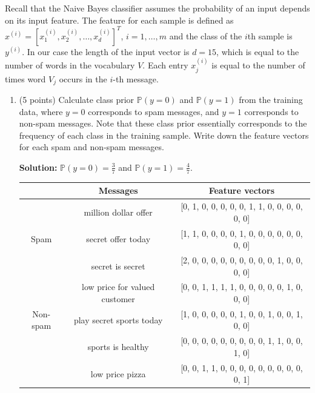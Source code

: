 \documentclass[twoside,10pt]{article}
\begin{document}
\begin{enumerate}
Recall that the Naive Bayes classifier assumes the probability of an input depends on its input feature. The feature for each sample is defined as
$x^{(i)} = [x_1^{(i)}, x_2^{(i)}, \ldots, x_d^{(i)}]^T$, $i = 1, \ldots, m$ and the class of the $i$th sample is $y^{(i)}$. In our case the length of the input vector is $d = 15$, which is equal to the number of words in the vocabulary $V$. Each entry $x_j^{(i)}$ is equal to the number of times word $V_j$ occurs in the $i$-th message. %

\begin{enumerate}
\item (5 points) Calculate class prior $\mathbb P(y = 0)$ and $\mathbb P(y = 1)$ from the training data, where $y = 0$ corresponds to spam messages, and $y = 1$ corresponds to non-spam messages. Note that these class prior essentially corresponds to the frequency of each class in the training sample. Write down the feature vectors for each spam and non-spam messages.
\begin{tcolorbox}
\textbf{Solution:} $\mathbb P(y = 0) = \frac 3 7$ and $\mathbb P(y = 1) = \frac 4 7$.
\begin{center}
	\begin{tabular}{| c | c | c |}%
	\hline
& Messages & Feature vectors \\
\hline
& million dollar offer & [0, 1, 0, 0, 0, 0, 0, 1, 1, 0, 0, 0, 0, 0, 0] \\
Spam & secret offer today & [1, 1, 0, 0, 0, 0, 1, 0, 0, 0, 0, 0, 0, 0, 0] \\
& secret is secret & [2, 0, 0, 0, 0, 0, 0, 0, 0, 0, 1, 0, 0, 0, 0] \\
\hline
& low price for valued customer & [0, 0, 1, 1, 1, 1, 0, 0, 0, 0, 0, 1, 0, 0, 0] \\
Non-spam & play secret sports today & [1, 0, 0, 0, 0, 0, 1, 0, 0, 1, 0, 0, 1, 0, 0] \\
& sports is healthy & [0, 0, 0, 0, 0, 0, 0, 0, 0, 1, 1, 0, 0, 1, 0] \\
& low price pizza & [0, 0, 1, 1, 0, 0, 0, 0, 0, 0, 0, 0, 0, 0, 1] \\
 \hline
        \end{tabular}
        \end{center}
\end{tcolorbox}


\end{enumerate}
\end{enumerate}
\end{document}
